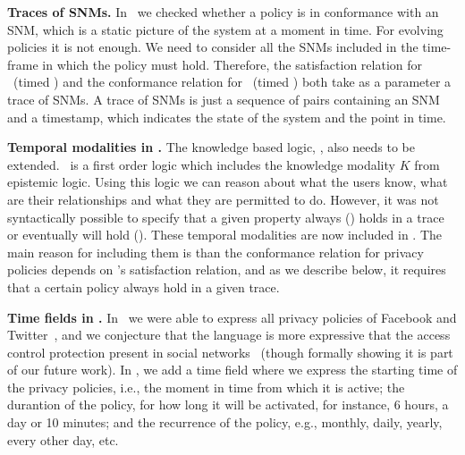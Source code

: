 \begin{inparaenum}[]
\item \textbf{Traces of SNMs.} In \fppf~we checked whether a policy is in conformance with an SNM, which is a static picture of the system at a moment in time. For evolving policies it is not enough. We need to consider all the SNMs included in the time-frame in which the policy must hold. Therefore, the satisfaction relation for \tkbl~(timed \kbl) and the conformance relation for \tppl~(timed \ppl) both take as a parameter a trace of SNMs. A trace of SNMs is just a sequence of pairs containing an SNM and a timestamp, which indicates the state of the system and the point in time.
  
\item \textbf{Temporal modalities in \tkbl.} The knowledge based logic, \kbl, also needs to be extended. \kbl~is a first order logic which includes the knowledge modality $K$ from epistemic logic. Using this logic we can reason about what the users know, what are their relationships and what they are permitted to do. However, it was not syntactically possible to specify that a given property always (\al) holds in a trace or eventually will hold (\ev). These temporal modalities are now included in \tkbl. The main reason for including them is than the conformance relation for privacy policies depends on \tkbl's satisfaction relation, and as we describe below, it requires that a certain policy always hold in a given trace.
  
\item \textbf{Time fields in \tppl.} In \ppl~we were able to express all privacy policies of Facebook and Twitter~\cite{PS14fpp}, and we conjecture that the language is more expressive that the access control protection present in social networks~\cite{BFS+12rbaceehl,F11rbacppl} (though formally showing it is part of our future work). In \tppl, we add a time field where we express the starting time of the privacy policies, i.e., the moment in time from which it is active; the durantion of the policy, for how long it will be activated, for instance, 6 hours, a day or 10 minutes; and the recurrence of the policy, e.g., monthly, daily, yearly, every other day, etc.

\end{inparaenum}

